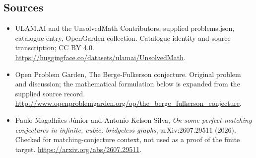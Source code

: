 \documentclass[11pt,a4paper]{article}
\begin{document}
\subsection{Sources}
\begin{itemize}
\item[S1] ULAM.AI and the UnsolvedMath Contributors, supplied problems.json, catalogue entry, OpenGarden collection. Catalogue identity and source transcription; CC BY 4.0.
\url{https://huggingface.co/datasets/ulamai/UnsolvedMath}.
\item[S2] Open Problem Garden, The Berge-Fulkerson conjecture. Original problem and discussion; the mathematical formulation below is expanded from the supplied source record.
\url{http://www.openproblemgarden.org/op/the_berge_fulkerson_conjecture}.
\item[S3] Paulo Magalh\~aes J\'unior and Antonio Kelson Silva, \emph{On some perfect matching conjectures in infinite, cubic, bridgeless graphs}, arXiv:2607.29511 (2026). Checked for matching-conjecture context, not used as a proof of the finite target.
\url{https://arxiv.org/abs/2607.29511}.
\end{itemize}
\end{document}
